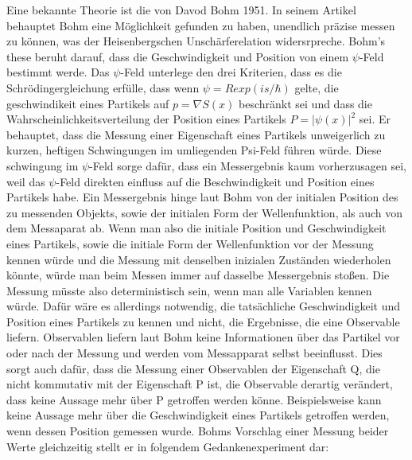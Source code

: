 Eine bekannte Theorie ist die von Davod Bohm 1951. In seinem Artikel behauptet Bohm eine Möglichkeit gefunden zu haben, unendlich präzise messen zu können, was der Heisenbergschen Unschärferelation widersrpreche.
Bohm's these beruht darauf, dass die Geschwindigkeit und Position von einem $\psi$-Feld bestimmt werde. Das $\psi$-Feld unterlege den drei Kriterien, dass es die Schrödingergleichung erfülle, dass wenn $\psi=R exp(is/\hbar)$ gelte, die geschwindikeit eines Partikels auf $p=\nabla S(x)$ beschränkt sei und dass die Wahrscheinlichkeitsverteilung der Position eines Partikels $P=|\psi(x)|^2$ sei. Er behauptet, dass die Messung einer Eigenschaft eines Partikels unweigerlich zu kurzen, heftigen Schwingungen im umliegenden Psi-Feld führen würde.
Diese schwingung im $\psi$-Feld sorge dafür, dass ein Messergebnis kaum vorherzusagen sei, weil das $\psi$-Feld direkten einfluss auf die Beschwindigkeit und Position eines Partikels habe. Ein Messergebnis hinge laut Bohm von der initialen Position des zu messenden Objekts, sowie der initialen Form der Wellenfunktion, als auch von dem Messaparat ab. Wenn man also die initiale Position und Geschwindigkeit eines Partikels, sowie die initiale Form der Wellenfunktion vor der Messung kennen würde und die Messung mit denselben inizialen Zuständen wiederholen könnte, würde man beim Messen immer auf dasselbe Messergebnis stoßen. Die Messung müsste also deterministisch sein, wenn man alle Variablen kennen würde. Dafür wäre es allerdings notwendig, die tatsächliche Geschwindigkeit und Position eines Partikels zu kennen und nicht, die Ergebnisse, die eine Observable liefern. Observablen liefern laut Bohm keine Informationen über das Partikel vor oder nach der Messung und werden vom Messapparat selbst beeinflusst. Dies sorgt auch dafür, dass die Messung einer Observablen der Eigenschaft Q, die nicht kommutativ mit der Eigenschaft P ist, die Observable derartig verändert, dass keine Aussage mehr über P getroffen werden könne. Beispielsweise kann keine Aussage mehr über die Geschwindigkeit eines Partikels getroffen werden, wenn dessen Position gemessen wurde.
Bohms Vorschlag einer Messung beider Werte gleichzeitig stellt er in folgendem Gedankenexperiment dar:\\
